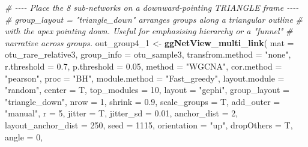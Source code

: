 \documentclass[
]{book}
\newenvironment{Shaded}{\begin{snugshade}}{\end{snugshade}}
\newcommand{\AttributeTok}[1]{\textcolor[rgb]{0.13,0.29,0.53}{#1}}
\newcommand{\CommentTok}[1]{\textcolor[rgb]{0.56,0.35,0.01}{\textit{#1}}}
\newcommand{\DecValTok}[1]{\textcolor[rgb]{0.00,0.00,0.81}{#1}}
\newcommand{\FloatTok}[1]{\textcolor[rgb]{0.00,0.00,0.81}{#1}}
\newcommand{\FunctionTok}[1]{\textcolor[rgb]{0.13,0.29,0.53}{\textbf{#1}}}
\newcommand{\NormalTok}[1]{#1}
\newcommand{\OtherTok}[1]{\textcolor[rgb]{0.56,0.35,0.01}{#1}}
\newcommand{\StringTok}[1]{\textcolor[rgb]{0.31,0.60,0.02}{#1}}
\begin{document}
\begin{Shaded}
\begin{Highlighting}[]
\CommentTok{\# {-}{-}{-}{-} Place the 8 sub{-}networks on a downward{-}pointing TRIANGLE frame {-}{-}{-}{-}}
\CommentTok{\# \textasciigrave{}group\_layout = "triangle\_down"\textasciigrave{} arranges groups along a triangular outline}
\CommentTok{\# with the apex pointing down. Useful for emphasising hierarchy or a "funnel"}
\CommentTok{\# narrative across groups.}
\NormalTok{out\_group4\_1 }\OtherTok{\textless{}{-}} \FunctionTok{ggNetView\_multi\_link}\NormalTok{(}
  \AttributeTok{mat                          =}\NormalTok{ otu\_rare\_relative3,}
  \AttributeTok{group\_info                   =}\NormalTok{ otu\_sample3,}
  \AttributeTok{transfrom.method             =} \StringTok{"none"}\NormalTok{,}
  \AttributeTok{r.threshold                  =} \FloatTok{0.7}\NormalTok{,}
  \AttributeTok{p.threshold                  =} \FloatTok{0.05}\NormalTok{,}
  \AttributeTok{method                       =} \StringTok{"WGCNA"}\NormalTok{,}
  \AttributeTok{cor.method                   =} \StringTok{"pearson"}\NormalTok{,}
  \AttributeTok{proc                         =} \StringTok{"BH"}\NormalTok{,}
  \AttributeTok{module.method                =} \StringTok{"Fast\_greedy"}\NormalTok{,}
  \AttributeTok{layout.module                =} \StringTok{"random"}\NormalTok{,}
  \AttributeTok{center                       =}\NormalTok{ T,}
  \AttributeTok{top\_modules                  =} \DecValTok{10}\NormalTok{,}
  \AttributeTok{layout                       =} \StringTok{"gephi"}\NormalTok{,}
  \AttributeTok{group\_layout                 =} \StringTok{"triangle\_down"}\NormalTok{,}
  \AttributeTok{nrow                         =} \DecValTok{1}\NormalTok{,}
  \AttributeTok{shrink                       =} \FloatTok{0.9}\NormalTok{,}
  \AttributeTok{scale\_groups                 =}\NormalTok{ T,}
  \AttributeTok{add\_outer                    =} \StringTok{"manual"}\NormalTok{,}
  \AttributeTok{r                            =} \DecValTok{5}\NormalTok{,}
  \AttributeTok{jitter                       =}\NormalTok{ T,}
  \AttributeTok{jitter\_sd                    =} \FloatTok{0.01}\NormalTok{,}
  \AttributeTok{anchor\_dist                  =} \DecValTok{2}\NormalTok{,}
  \AttributeTok{layout\_anchor\_dist           =} \DecValTok{250}\NormalTok{,}
  \AttributeTok{seed                         =} \DecValTok{1115}\NormalTok{,}
  \AttributeTok{orientation                  =} \StringTok{"up"}\NormalTok{,}
  \AttributeTok{dropOthers                   =}\NormalTok{ T,}
  \AttributeTok{angle                        =} \DecValTok{0}\NormalTok{,}

\end{Highlighting}
\end{Shaded}
\end{document}
